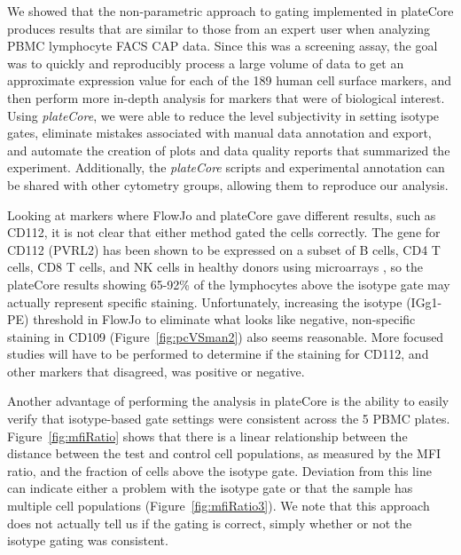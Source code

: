 \documentclass[12pt]{article}
\newcommand{\Rpackage}[1]{{\textit{#1}}}
\begin{document}
We showed that the non-parametric approach to gating implemented in plateCore
produces results that are similar to those from an expert user when analyzing
PBMC lymphocyte FACS CAP data. Since this was a screening assay, the goal was to
quickly and reproducibly process a large volume of data to get an approximate
expression value for each of the 189 human cell surface markers, and then
perform more in-depth analysis for markers that were of biological interest.
Using \Rpackage{plateCore}, we were able to reduce the level subjectivity in
setting isotype gates, eliminate mistakes associated with manual data
annotation and export, and automate the creation of plots and data quality
reports that summarized the experiment. Additionally, the \Rpackage{plateCore}
scripts and experimental annotation can be shared with other cytometry groups,
allowing them to reproduce our analysis.

Looking at markers where FlowJo and plateCore gave different results, such as
CD112, it is not clear that either method gated the cells correctly.
The gene for CD112 (PVRL2) has been shown to be expressed on a subset of B cells,
CD4 T cells, CD8 T cells, and NK cells in healthy donors using microarrays
\citep{Critchley2007}, so the plateCore results showing 65-92\% of the
lymphocytes above the isotype gate may actually represent specific staining.
Unfortunately, increasing the isotype (IGg1-PE) threshold in FlowJo to
eliminate what looks like negative, non-specific staining in CD109
(Figure~\ref{fig:pcVSman2}) also seems reasonable. More focused studies will
have to be performed to determine if the staining for CD112, and other markers
that disagreed, was positive or negative.

Another advantage of performing the analysis in plateCore is the ability to
easily verify that isotype-based gate settings were consistent across the 5
PBMC plates. Figure~\ref{fig:mfiRatio} shows that there is a linear
relationship between the distance between the test and control cell
populations, as measured by the MFI ratio, and the fraction of cells above the
isotype gate. Deviation from this line can indicate either a problem with the
isotype gate or that the sample has multiple cell populations
(Figure~\ref{fig:mfiRatio3}). We note that this approach does not actually tell
us if the gating is correct, simply whether or not the isotype gating was
consistent.
\end{document}

